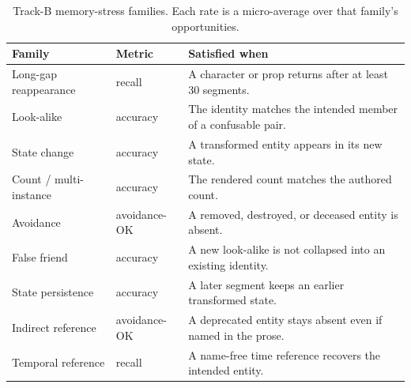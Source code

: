 \begin{table}[!t]
\centering
\caption{Track-B memory-stress families. Each rate is a micro-average over that family's opportunities.}
\label{tab:trackb-families}
\footnotesize
\setlength{\tabcolsep}{3.5pt}
\renewcommand{\arraystretch}{1.02}
\begin{tabular}{@{}l l p{}@{}}
\toprule
Family & Metric & Satisfied when \\
\midrule
Long-gap reappearance & recall & A character or prop returns after at least 30 segments. \\
Look-alike & accuracy & The identity matches the intended member of a confusable pair. \\
State change & accuracy & A transformed entity appears in its new state. \\
Count / multi-instance & accuracy & The rendered count matches the authored count. \\
Avoidance & avoidance-OK & A removed, destroyed, or deceased entity is absent. \\
False friend & accuracy & A new look-alike is not collapsed into an existing identity. \\
State persistence & accuracy & A later segment keeps an earlier transformed state. \\
Indirect reference & avoidance-OK & A deprecated entity stays absent even if named in the prose. \\
Temporal reference & recall & A name-free time reference recovers the intended entity. \\
\bottomrule
\end{tabular}
\end{table}
